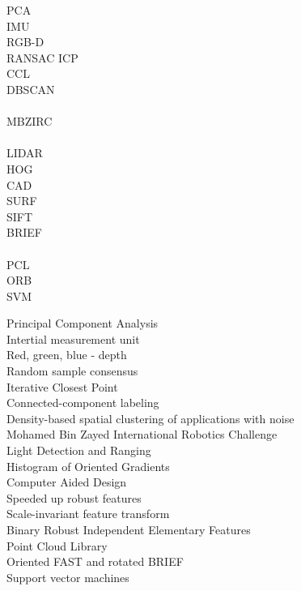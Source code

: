 \begin{symb}
    PCA \\ 
    IMU \\ 
    RGB-D \\ 
    RANSAC \newline
    ICP \\
    CCL \\
    DBSCAN \\ \\
    MBZIRC \\ \\
    LIDAR \\
    HOG \\
    CAD \\
    SURF \\
    SIFT \\
    BRIEF \\ \\
    PCL \\ 
    ORB \\
    SVM

    \newpage \noindent
    Principal Component Analysis \\
    Intertial measurement unit \\
    Red, green, blue - depth  \\
    Random sample consensus \\
    Iterative Closest Point \\
    Connected-component labeling \\
    Density-based spatial clustering of applications with noise \\ 
    Mohamed Bin Zayed International Robotics Challenge \\
    Light Detection and Ranging \\
    Histogram of Oriented Gradients \\
    Computer Aided Design \\
    Speeded up robust features \\
    Scale-invariant feature transform \\
    Binary Robust Independent Elementary Features \\
    Point Cloud Library \\
    Oriented FAST and rotated BRIEF \\
    Support vector machines
\end{symb}
